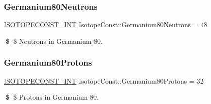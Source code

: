 \subsubsection{\texorpdfstring{Germanium80\+Neutrons}{Germanium80Neutrons}}
{\footnotesize\ttfamily \mbox{\hyperlink{group___isotope_const-_macros_ga5f18360b3e99483a35c32d789e62621c}{I\+S\+O\+T\+O\+P\+E\+C\+O\+N\+S\+T\+\_\+\+I\+NT}} Isotope\+Const\+::\+Germanium80\+Neutrons = 48}

\$ \$ Neutrons in Germanium-\/80. \mbox{\label{group___isotope_const-_germanium-_ge80_ga56ec9faf74268a2ebdd3ab745df6b556}} 
\subsubsection{\texorpdfstring{Germanium80\+Protons}{Germanium80Protons}}
{\footnotesize\ttfamily \mbox{\hyperlink{group___isotope_const-_macros_ga5f18360b3e99483a35c32d789e62621c}{I\+S\+O\+T\+O\+P\+E\+C\+O\+N\+S\+T\+\_\+\+I\+NT}} Isotope\+Const\+::\+Germanium80\+Protons = 32}

\$ \$ Protons in Germanium-\/80. 